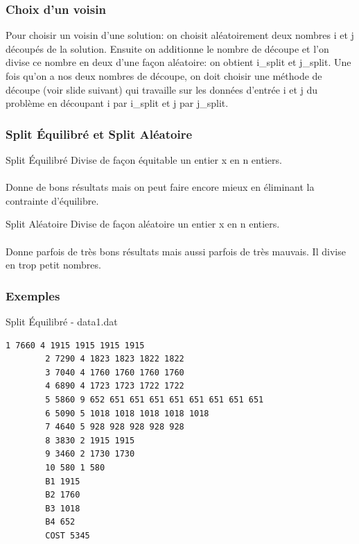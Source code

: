 \documentclass{beamer}
\begin{document}
\begin{frame}
    \frametitle{Choix d'un voisin}
    Pour choisir un voisin d'une solution: on choisit aléatoirement deux nombres i et j découpés de la solution. Ensuite on additionne le nombre de découpe et l'on divise ce nombre en deux d'une façon aléatoire: on obtient i\_split et j\_split. Une fois qu'on a nos deux nombres de découpe, on doit choisir une méthode de découpe (voir slide suivant) qui travaille sur les données d'entrée i et j du problème en découpant i par i\_split et j par j\_split. 
\end{frame}

\begin{frame}
    \frametitle{Split Équilibré et Split Aléatoire}
    \begin{block}{Split Équilibré}
    Divise de façon équitable un entier x en n entiers.\\~\\
    \MVRightarrow{} Donne de bons résultats mais on peut faire encore mieux en éliminant la contrainte d'équilibre.
    \end{block}

    \begin{block}{Split Aléatoire}
    Divise de façon aléatoire un entier x en n entiers.\\~\\
    \MVRightarrow{} Donne parfois de très bons résultats mais aussi parfois de très mauvais. Il divise en trop petit nombres.
    \end{block}
\end{frame}

\begin{frame}[fragile]
    \frametitle{Exemples}
    \begin{exampleblock}{Split Équilibré - data1.dat}
        \begin{lstlisting}[basicstyle=\small]
        1 7660 4 1915 1915 1915 1915 
        2 7290 4 1823 1823 1822 1822 
        3 7040 4 1760 1760 1760 1760 
        4 6890 4 1723 1723 1722 1722 
        5 5860 9 652 651 651 651 651 651 651 651 651 
        6 5090 5 1018 1018 1018 1018 1018 
        7 4640 5 928 928 928 928 928 
        8 3830 2 1915 1915 
        9 3460 2 1730 1730 
        10 580 1 580 
        B1 1915
        B2 1760
        B3 1018
        B4 652
        COST 5345
        \end{lstlisting}
    \end{exampleblock}
\end{frame}
\end{document}
